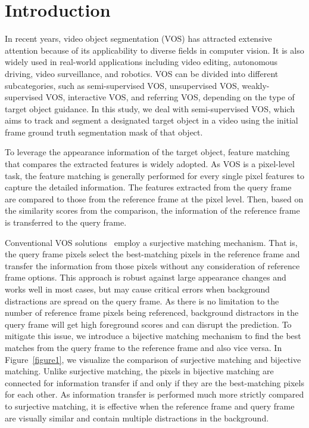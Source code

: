 \documentclass[10pt,twocolumn,letterpaper]{article}
\begin{document}
	
	
\section{Introduction}
	In recent years, video object segmentation (VOS) has attracted extensive attention because of its applicability to diverse fields in computer vision. It is also widely used in real-world applications including video editing, autonomous driving, video surveillance, and robotics. VOS can be divided into different subcategories, such as semi-supervised VOS, unsupervised VOS, weakly-supervised VOS, interactive VOS, and referring VOS, depending on the type of target object guidance. In this study, we deal with semi-supervised VOS, which aims to track and segment a designated target object in a video using the initial frame ground truth segmentation mask of that object. 
	
	
	To leverage the appearance information of the target object, feature matching that compares the extracted features is widely adopted. As VOS is a pixel-level task, the feature matching is generally performed for every single pixel features to capture the detailed information. The features extracted from the query frame are compared to those from the reference frame at the pixel level. Then, based on the similarity scores from the comparison, the information of the reference frame is transferred to the query frame. 
	
	
	Conventional VOS solutions~\cite{PLM, RANet, STM, CFBI} employ a surjective matching mechanism. That is, the query frame pixels select the best-matching pixels in the reference frame and transfer the information from those pixels without any consideration of reference frame options. This approach is robust against large appearance changes and works well in most cases, but may cause critical errors when background distractions are spread on the query frame. As there is no limitation to the number of reference frame pixels being referenced, background distractors in the query frame will get high foreground scores and can disrupt the prediction. To mitigate this issue, we introduce a bijective matching mechanism to find the best matches from the query frame to the reference frame and also vice versa. In Figure~\ref{figure1}, we visualize the comparison of surjective matching and bijective matching. Unlike surjective matching, the pixels in bijective matching are connected for information transfer if and only if they are the best-matching pixels for each other. As information transfer is performed much more strictly compared to surjective matching, it is effective when the reference frame and query frame are visually similar and contain multiple distractions in the background. 
	
\end{document}
